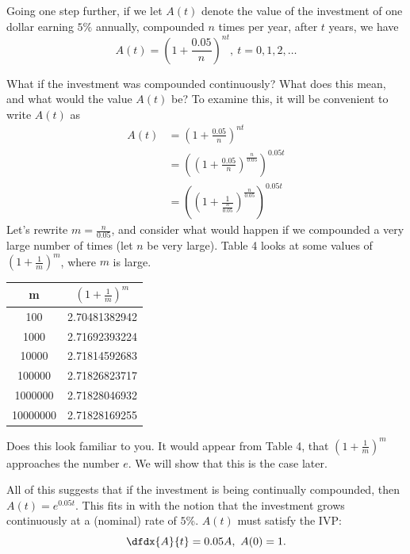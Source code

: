 \begin{myexample}
Going one step further, if we let $A(t)$ denote the value of the investment
of one dollar earning $5\%$ annually, compounded $n$ times per year,
after $t$
years,  we have
$$
A(t)=\left(1+\frac{0.05}{n}\right)^{nt},\ t=0,1,2,\ldots
$$

What if the investment was compounded continuously?  What does this
mean, and what would the value $A(t)$ be?  To examine this, it will be
convenient to write $A(t)$ as
\begin{align*}
  A(t)&=\left(1+\frac{0.05}{n}\right)^{nt}\\
      &=\left(\left(1+\frac{0.05}{n}\right)^{\frac{n}{0.05}}\right)^{0.05t}\\
      &=\left(\left(1+\frac{1}{\frac{n}{0.05}}\right)^{\frac{n}{0.05}}\right)^{0.05t}
\end{align*}
Let’s rewrite $m=\frac{n}{0.05}$, and consider what would happen if we compounded a very
large number of times (let $n$ be very large).  Table 4 looks at some
values of $\left(1+\frac{1}{m}\right)^m$, where $m$ is large.
\begin{table}[h]
  \centering
  \begin{center}
    \begin{tabular}[h]{|c|c|}\hline
      m & $\left(1+\frac{1}{m}\right)^m$\bigstrut{}\\\hline
     100  & 2.70481382942\bigstrut{}\\
     1000  & 2.71692393224\bigstrut{}\\
     10000  & 2.71814592683\bigstrut{}\\
     100000  & 2.71826823717\bigstrut{}\\
     1000000  & 2.71828046932\bigstrut{}\\
     10000000  & 2.71828169255\bigstrut{}\\\hline
    \end{tabular}
  \end{center}
\end{table}
Does this look familiar to you.  It would appear from Table 4, that
$\left(1+\frac{1}{m}\right)^m$ approaches the number $e$.  We will show that this is the case later.

All of this suggests that if the investment is being continually
compounded, then $A(t)=e^{0.05t}$. This fits in with the notion that
the investment grows continuously at a (nominal) rate of $5$\%. $A(t)$
must satisfy the IVP:
$$
\dfdx{A}{t}=0.05A,\ A(0)=1.
$$


\end{myexample}
